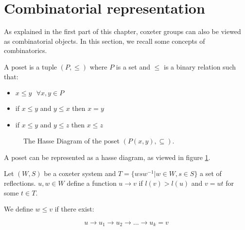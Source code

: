 \section{Combinatorial representation}

As explained in the first part of this chapter, coxeter groups can also be viewed as combinatorial objects. In this section, we recall some concepts of combinatorics.

\begin{definition}
  A poset is a tuple $(P, \leq)$ where $P$ is a set and $\leq$ is a binary relation such that:

  \begin{itemize}
    \item $x \leq y\ \ \ \forall x,y \in P$
    \item if $x \leq y$ and $y \leq x$ then $x = y$
    \item if $x \leq y$ and $y \leq z$ then $x \leq z$
  \end{itemize}
\end{definition}

\begin{figure}
  \begin{center}
\end{center}
\caption{The Hasse Diagram of the poset $(P({x,y}), \subseteq)$.}
\label{fig:hasse}
\end{figure}

A poset can be represented as a hasse diagram, as viewed in figure \ref{fig:hasse}.

\begin{definition}
Let $(W,S)$ be a coxeter system and $T = \{wsw^{-1} | w \in W, s \in S\}$ a set of reflections. $u, w \in W$ define a function $u \to v$ if $l(v) > l(u)$ and $v = ut$ for some $t \in T$.

We define $w \leq v$ if there exist:

\begin{equation}
u \to u_1 \to u_2 \to \dots \to u_k = v
\end{equation}
\end{definition}

